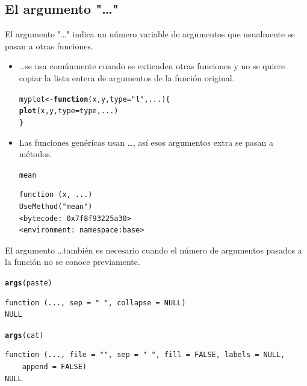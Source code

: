 \documentclass{article}\usepackage[]{graphicx}\usepackage[]{color}
\makeatletter
\newcommand{\hlstr}[1]{\textcolor[rgb]{0.192,0.494,0.8}{#1}}%
\newcommand{\hlstd}[1]{\textcolor[rgb]{0.345,0.345,0.345}{#1}}%
\newcommand{\hlkwa}[1]{\textcolor[rgb]{0.161,0.373,0.58}{\textbf{#1}}}%
\newcommand{\hlkwb}[1]{\textcolor[rgb]{0.69,0.353,0.396}{#1}}%
\newcommand{\hlkwc}[1]{\textcolor[rgb]{0.333,0.667,0.333}{#1}}%
\newcommand{\hlkwd}[1]{\textcolor[rgb]{0.737,0.353,0.396}{\textbf{#1}}}%
\newenvironment{kframe}{%
 \def\at@end@of@kframe{}%
 \ifinner\ifhmode%
  \def\at@end@of@kframe{\end{minipage}}%
  \begin{minipage}{\columnwidth}%
 \fi\fi%
 \def\FrameCommand##1{\hskip\@totalleftmargin \hskip-\fboxsep
 \colorbox{shadecolor}{##1}\hskip-\fboxsep
     \hskip-\linewidth \hskip-\@totalleftmargin \hskip\columnwidth}%
 \MakeFramed {\advance\hsize-\width
   \@totalleftmargin\z@ \linewidth\hsize
   \@setminipage}}%
 {\par\unskip\endMakeFramed%
 \at@end@of@kframe}
\newenvironment{knitrout}{}{} %
\makeatother
\begin{document}
  \subsection{El argumento "\dots"}
  El argumento "\dots" indica un número variable de argumentos que usualmente se pasan a otras funciones.
  \begin{itemize}
    \item \dots se usa comúnmente cuando se extienden otras funciones y no se quiere copiar la lista entera de argumentos de la función original.
\begin{knitrout}
\color{fgcolor}\begin{kframe}
\begin{alltt}
  \hlstd{myplot} \hlkwb{<-} \hlkwa{function}\hlstd{(}\hlkwc{x}\hlstd{,} \hlkwc{y}\hlstd{,} \hlkwc{type} \hlstd{=} \hlstr{"l"}\hlstd{,} \hlkwc{...}\hlstd{)\{}
    \hlkwd{plot}\hlstd{(x, y,} \hlkwc{type} \hlstd{= type, ...)}
  \hlstd{\}}
\end{alltt}
\end{kframe}
\end{knitrout}
    \item Las funciones genéricas usan \dots, así esos argumentos extra se pasan a métodos.
\begin{knitrout}
\color{fgcolor}\begin{kframe}
\begin{alltt}
  \hlstd{mean}
\end{alltt}
\begin{verbatim}
function (x, ...) 
UseMethod("mean")
<bytecode: 0x7f8f93225a30>
<environment: namespace:base>
\end{verbatim}
\end{kframe}
\end{knitrout}
  \end{itemize}

  El argumento \dots también es necesario cuando el número de argumentos pasados a la función no se conoce previamente.
\begin{knitrout}
\color{fgcolor}\begin{kframe}
\begin{alltt}
  \hlkwd{args}\hlstd{(paste)}
\end{alltt}
\begin{verbatim}
function (..., sep = " ", collapse = NULL) 
NULL
\end{verbatim}
\begin{alltt}
  \hlkwd{args}\hlstd{(cat)}
\end{alltt}
\begin{verbatim}
function (..., file = "", sep = " ", fill = FALSE, labels = NULL, 
    append = FALSE) 
NULL
\end{verbatim}
\end{kframe}
\end{knitrout}
  
\end{document}

